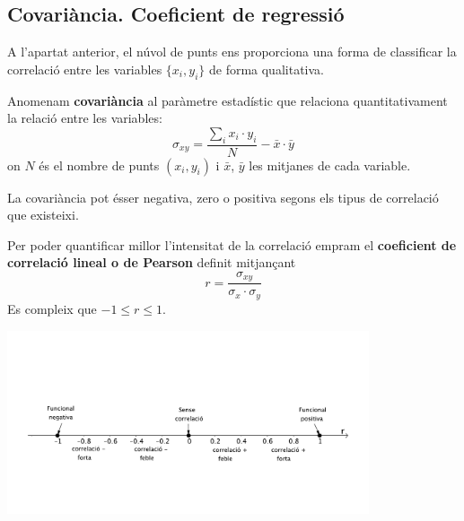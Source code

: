 \pagebreak

\subsection{Covariància. Coeficient de regressió}
\begin{theorybox}
	A l'apartat anterior, el núvol de punts ens proporciona una forma de classificar la correlació entre les variables $\{x_i, y_i\}$ de forma qualitativa.
	
	Anomenam \textbf{covariància} al paràmetre estadístic que relaciona quantitativament la relació entre les variables:
	\begin{equation}
		\sigma_{xy} = \frac{\sum_i x_i \cdot y_i}{N} - \bar x \cdot \bar y
	\end{equation}
	on $N$ és el nombre de punts $(x_i, y_i)$  i $\bar x$, $\bar y$ les mitjanes de cada variable. 
	
	La covariància pot ésser negativa, zero o positiva segons els tipus de correlació que existeixi.
	
	Per poder quantificar millor l'intensitat de la correlació empram el \textbf{coeficient de correlació lineal o de Pearson} definit mitjançant
	\begin{equation}
		r = \frac{\sigma_{xy}}{\sigma_x \cdot \sigma_y} 
	\end{equation}
	Es compleix que $-1\leq r \leq 1$.
	\begin{center}
		\includegraphics[width=0.8\textwidth]{img-11/coefcorr}
	\end{center}
\end{theorybox}	

\vspace{1cm}

